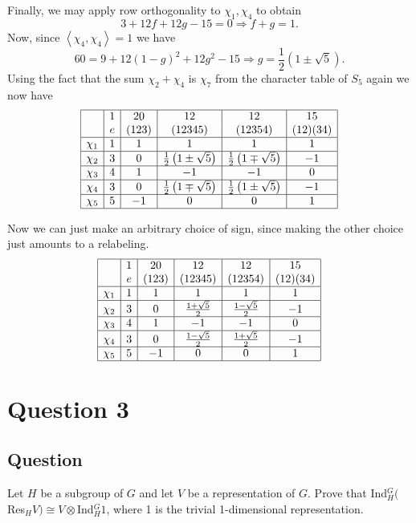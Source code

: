 \documentclass[11pt]{article}
\begin{document}
Finally, we may apply row orthogonality to $\chi_1, \chi_4$ to obtain
\[3+12 f +12 g -15 = 0 \Rightarrow f+ g = 1.\]
Now, since $\left< \chi_4, \chi_4\right> =1$ we have 
\[ 60 = 9 +12 (1-g)^2 + 12 g^2 -15 \Rightarrow g =\frac{1}{2} \left(1 \pm \sqrt{5}\right) .\]
Using the fact that the sum $\chi_2 + \chi_4$ is $\chi_7$ from the character table of $S_5$ again we now have
\[
\begin{array}{|c|c|c|c|c|c|}
\hline
&1&20&12&12&15\\
&e&(123)&(12345)&(12354)&(12)(34)\\
\hline
\chi_1&1&1&1&1&1\\
\hline
\chi_2&3&0&\frac{1}{2} \left(1 \pm \sqrt{5}\right)&\frac{1}{2} \left(1 \mp \sqrt{5}\right)&-1\\
\hline
\chi_3&4&1&-1&-1&0\\
\hline
\chi_4&3&0&\frac{1}{2} \left(1 \mp \sqrt{5}\right)&\frac{1}{2} \left(1 \pm \sqrt{5}\right)&-1\\
\hline
\chi_5&5&-1&0&0&1\\
\hline
\end{array}\]

Now we can just make an arbitrary choice of sign, since making the other choice just amounts to a relabeling.
\[
\begin{array}{|c|c|c|c|c|c|}
\hline
&1&20&12&12&15\\
&e&(123)&(12345)&(12354)&(12)(34)\\
\hline
\chi_1&1&1&1&1&1\\
\hline
\chi_2&3&0& \frac{1+\sqrt5}{2}&\frac{1-\sqrt5}{2}&-1\\
\hline
\chi_3&4&1&-1&-1&0\\
\hline
\chi_4&3&0&\frac{1-\sqrt5}{2}&\frac{1+\sqrt5}{2}&-1\\
\hline
\chi_5&5&-1&0&0&1\\
\hline
\end{array}\]


\section{Question 3}
\subsection{Question}
Let $H$ be a subgroup of $G$ and let $V$ be a representation of $G$. Prove that Ind$_H^G($Res$_HV)  \cong V \otimes$Ind$_H^G1$, where 1 is the trivial 1-dimensional representation.
\end{document}
